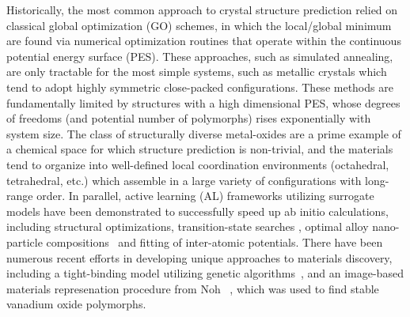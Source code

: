 %
%
Historically, the most common approach to crystal structure prediction relied on classical global optimization (GO) schemes,
in which the local/global minimum are found via numerical optimization routines that operate within the continuous potential energy surface (PES).  %
%
These approaches, such as simulated annealing, are only tractable for the most simple systems,
such as metallic crystals which tend to adopt highly symmetric close-packed configurations.
%
These methods are fundamentally limited by structures with a high dimensional PES, whose degrees of freedoms (and potential number of polymorphs) rises exponentially with system size.\cite{Stillinger1999} The class of structurally diverse metal-oxides are a prime example of a chemical space for which structure prediction is non-trivial, and the materials tend to organize into well-defined local coordination environments (octahedral, tetrahedral, etc.) which assemble in a large variety of configurations with long-range order.
%
In parallel, active learning (AL) frameworks utilizing surrogate models have been demonstrated to successfully speed up ab initio calculations, including structural optimizations\cite{hansen2019atomistic}, transition-state searches \cite{torres2019low}, optimal alloy nano-particle compositions~\cite{Jennings2019} and fitting of inter-atomic potentials.\cite{podryabinkin2017active}
%
There have been numerous recent efforts in developing unique approaches to materials discovery, including a tight-binding model utilizing genetic algorithms~\cite{VanDenBossche2018}, and an image-based materials represenation procedure from Noh ~\cite{noh2019inverse}, which was used to find stable vanadium oxide polymorphs.
